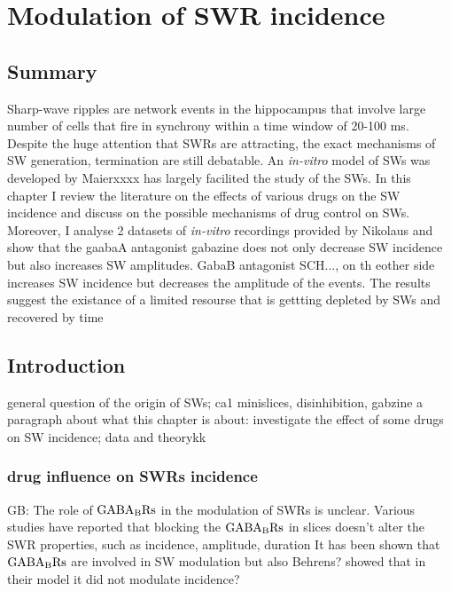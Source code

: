 \chapter{Modulation of SWR incidence}

\section{Summary}

  Sharp-wave ripples are network events in the hippocampus that involve large
  number of cells that fire in synchrony within a time window of 20-100 ms.
  Despite the huge attention that SWRs are attracting, the exact mechanisms of SW
  generation, termination are still debatable.  An {\it in-vitro} model of SWs was
  developed by Maierxxxx has largely facilited the study of the SWs. In this
  chapter I review the literature on the effects of various drugs on the SW
  incidence and discuss on the possible mechanisms of drug control on SWs.
  Moreover, I analyse 2 datasets of {\it in-vitro} recordings provided by Nikolaus and
  show that the gaabaA antagonist gabazine does not only decrease SW incidence
  but also increases SW amplitudes. GabaB antagonist SCH..., on th eother side
  increases SW incidence but decreases the amplitude of the events. The results
  suggest the existance of a limited resourse that is gettting depleted by SWs
  and recovered by time


\section{Introduction}
  general question of the origin of SWs; ca1 minislices, disinhibition, gabzine 
  a paragraph about what this chapter is about: investigate the effect of some drugs
  on SW incidence; data and theorykk

  \subsection{drug influence on SWRs incidence}
  \label{swr_modulation}
  GB: 
    The role of $\rm GABA_B Rs$ in the modulation of SWRs is unclear. Various
    studies have reported that blocking the $\rm GABA_B Rs$ in slices doesn't
    alter the SWR properties, such as incidence, amplitude, duration
    \cite{Hollnagel2014, Hofer2015}
    It has been shown that $\rm GABA_B Rs$ are involved in SW modulation 
    \cite{Maier2102}
    but also Behrens? showed that in their model it did not modulate incidence?



